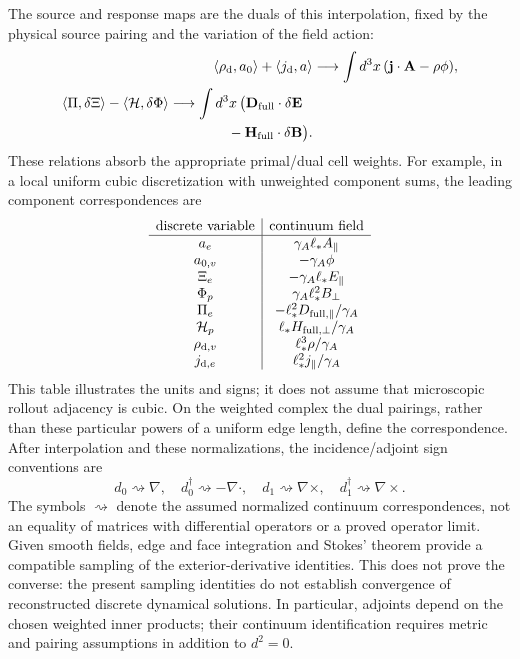 \documentclass[11pt]{article}
\begin{document}
The source and response maps are the duals of this interpolation, fixed by the physical source pairing and the variation of the field action:
\begin{align}
\langle\rho_{\rm d},a_0\rangle+\langle j_{\rm d},a\rangle
&\longrightarrow\int d^3x\,(\mathbf j\cdot\mathbf A-\rho\phi),\\
\begin{split}
\langle\Pi,\delta\Xi\rangle-\langle\mathcal H,\delta\Phi\rangle
&\longrightarrow\int d^3x\,\bigl(
\mathbf D_{\rm full}\cdot\delta\mathbf E\\
&\hspace{4.2em}-\mathbf H_{\rm full}\cdot\delta\mathbf B\bigr).
\end{split}
\end{align}
These relations absorb the appropriate primal/dual cell weights. For example, in a local uniform cubic discretization with unweighted component sums, the leading component correspondences are
\begin{equation}
\begin{array}{c|c}
\text{discrete variable} & \text{continuum field}\\
\hline
a_e & \gamma_A\ell_* A_\parallel\\
a_{0,v} & -\gamma_A\phi\\
\Xi_e & -\gamma_A\ell_* E_\parallel\\
\Phi_p & \gamma_A\ell_*^2 B_\perp\\
\Pi_e & -\ell_*^2 D_{{\rm full},\parallel}/\gamma_A\\
\mathcal H_p & \ell_* H_{{\rm full},\perp}/\gamma_A\\
\rho_{{\rm d},v} & \ell_*^3\rho/\gamma_A\\
j_{{\rm d},e} & \ell_*^2 j_\parallel/\gamma_A
\end{array}
\end{equation}
This table illustrates the units and signs; it does not assume that microscopic rollout adjacency is cubic. On the weighted complex the dual pairings, rather than these particular powers of a uniform edge length, define the correspondence. After interpolation and these normalizations, the incidence/adjoint sign conventions are
\begin{equation}
d_0\rightsquigarrow\nabla,\quad
d_0^\dagger\rightsquigarrow-\nabla\!\cdot,\quad
d_1\rightsquigarrow\nabla\!\times,\quad
d_1^\dagger\rightsquigarrow\nabla\!\times.
\end{equation}
The symbols $\rightsquigarrow$ denote the assumed normalized continuum correspondences, not an equality of matrices with differential operators or a proved operator limit. Given smooth fields, edge and face integration and Stokes' theorem provide a compatible sampling of the exterior-derivative identities. This does not prove the converse: the present sampling identities do not establish convergence of reconstructed discrete dynamical solutions. In particular, adjoints depend on the chosen weighted inner products; their continuum identification requires metric and pairing assumptions in addition to $d^2=0$.
\end{document}
